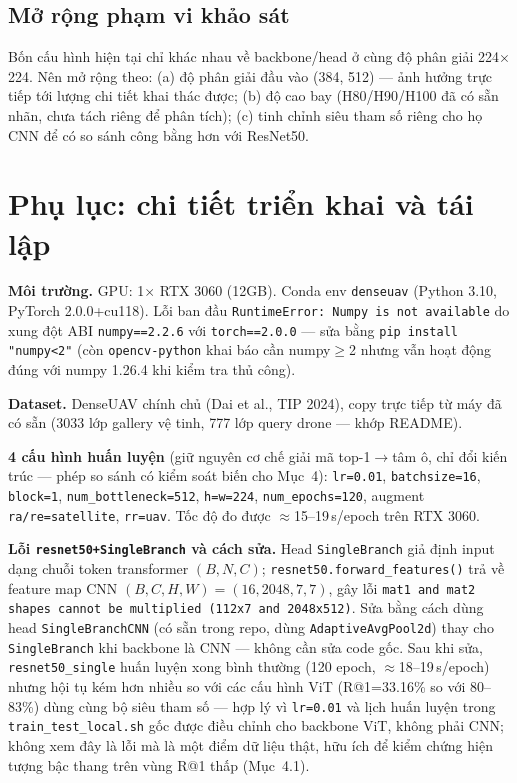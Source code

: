 \documentclass[11pt]{article}
\begin{document}
\subsection{Mở rộng phạm vi khảo sát}

Bốn cấu hình hiện tại chỉ khác nhau về backbone/head ở cùng độ phân giải 224$\times$224. Nên mở rộng theo: (a) độ phân giải đầu vào (384, 512) --- ảnh hưởng trực tiếp tới lượng chi tiết khai thác được; (b) độ cao bay (H80/H90/H100 đã có sẵn nhãn, chưa tách riêng để phân tích); (c) tinh chỉnh siêu tham số riêng cho họ CNN để có so sánh công bằng hơn với ResNet50.

\appendix
\section{Phụ lục: chi tiết triển khai và tái lập}

\textbf{Môi trường.} GPU: 1$\times$ RTX 3060 (12GB). Conda env \texttt{denseuav} (Python 3.10, PyTorch 2.0.0+cu118). Lỗi ban đầu \texttt{RuntimeError: Numpy is not available} do xung đột ABI \texttt{numpy==2.2.6} với \texttt{torch==2.0.0} — sửa bằng \texttt{pip install "numpy<2"} (còn \texttt{opencv-python} khai báo cần numpy$\ge$2 nhưng vẫn hoạt động đúng với numpy 1.26.4 khi kiểm tra thủ công).

\textbf{Dataset.} DenseUAV chính chủ (Dai et al., TIP 2024), copy trực tiếp từ máy đã có sẵn (3033 lớp gallery vệ tinh, 777 lớp query drone — khớp README).

\textbf{4 cấu hình huấn luyện} (giữ nguyên cơ chế giải mã top-1$\to$tâm ô, chỉ đổi kiến trúc — phép so sánh có kiểm soát biến cho Mục~4): \texttt{lr=0.01}, \texttt{batchsize=16}, \texttt{block=1}, \texttt{num\_bottleneck=512}, \texttt{h=w=224}, \texttt{num\_epochs=120}, augment \texttt{ra/re=satellite}, \texttt{rr=uav}. Tốc độ đo được $\approx$15--19\,s/epoch trên RTX 3060.

\textbf{Lỗi \texttt{resnet50+SingleBranch} và cách sửa.} Head \texttt{SingleBranch} giả định input dạng chuỗi token transformer $(B,N,C)$; \texttt{resnet50.forward\_features()} trả về feature map CNN $(B,C,H,W)=(16,2048,7,7)$, gây lỗi \texttt{mat1 and mat2 shapes cannot be multiplied (112x7 and 2048x512)}. Sửa bằng cách dùng head \texttt{SingleBranchCNN} (có sẵn trong repo, dùng \texttt{AdaptiveAvgPool2d}) thay cho \texttt{SingleBranch} khi backbone là CNN — không cần sửa code gốc. Sau khi sửa, \texttt{resnet50\_single} huấn luyện xong bình thường (120 epoch, $\approx$18--19\,s/epoch) nhưng hội tụ kém hơn nhiều so với các cấu hình ViT (R@1=33.16\% so với 80--83\%) dùng cùng bộ siêu tham số — hợp lý vì \texttt{lr=0.01} và lịch huấn luyện trong \texttt{train\_test\_local.sh} gốc được điều chỉnh cho backbone ViT, không phải CNN; không xem đây là lỗi mà là một điểm dữ liệu thật, hữu ích để kiểm chứng hiện tượng bậc thang trên vùng R@1 thấp (Mục~4.1).
\end{document}

